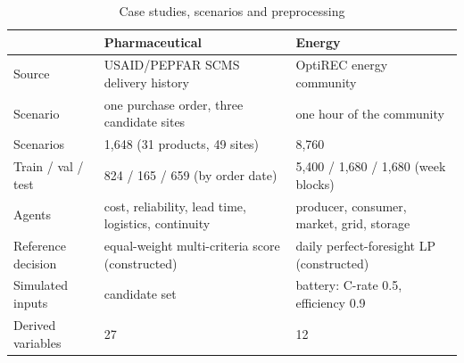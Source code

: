 \begin{table}[t]
\caption{Case studies, scenarios and preprocessing}\label{tab:data}
\footnotesize
\begin{tabular}{@{}lp{5.2cm}p{5.2cm}@{}}
\toprule
 & Pharmaceutical & Energy \\
\midrule
Source & USAID/PEPFAR SCMS delivery history \citep{scmsdata2015} & OptiREC energy community \citep{optirecdata2025} \\
Scenario & one purchase order, three candidate sites & one hour of the community \\
Scenarios & 1,648 (31 products, 49 sites) & 8,760 \\
Train / val / test & 824 / 165 / 659 (by order date) & 5,400 / 1,680 / 1,680 (week blocks) \\
Agents & cost, reliability, lead time, logistics, continuity & producer, consumer, market, grid, storage \\
Reference decision & equal-weight multi-criteria score (constructed) & daily perfect-foresight LP (constructed) \\
Simulated inputs & candidate set & battery: C-rate 0.5, efficiency 0.9 \\
Derived variables & 27 & 12 \\
\bottomrule
\end{tabular}
\end{table}
